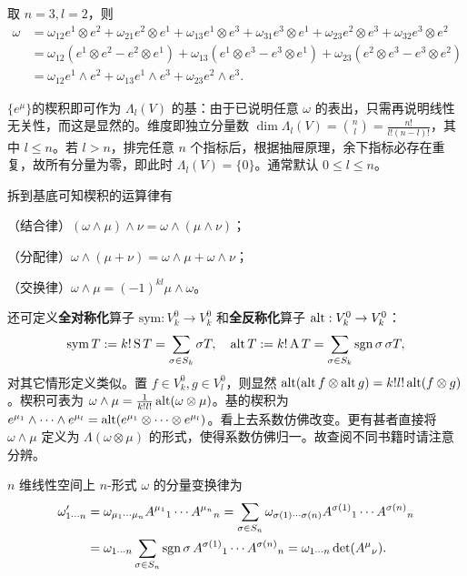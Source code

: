 \begin{example}
    取 $n=3,l=2$，则
\begin{align*}
    \omega&=\omega_{12}e^1\otimes e^2+\omega_{21}e^2\otimes e^1+\omega_{13}e^1\otimes e^3+\omega_{31}e^3\otimes e^1+\omega_{23}e^2\otimes e^3+\omega_{32}e^3\otimes e^2\\
    &=\omega_{12}(e^1\otimes e^2-e^2\otimes e^1)+\omega_{13}(e^1\otimes e^3-e^3\otimes e^1)+\omega_{23}(e^2\otimes e^3-e^3\otimes e^2)\\
    &=\omega_{12}e^1\wedge e^2+\omega_{13}e^1\wedge e^3+\omega_{23}e^2\wedge e^3.
\end{align*}
\end{example}

$\{e^\mu\}$的楔积即可作为 $\Lambda_l(V)$ 的基：由于已说明任意 $\omega$ 的表出，只需再说明线性无关性，而这是显然的。维度即独立分量数 $\dim\Lambda_l(V)=\binom{n}{l}=\frac{n!}{l!(n-l)!}$，其中 $l\leqslant n$。若 $l>n$，排完任意 $n$ 个指标后，根据抽屉原理，余下指标必存在重复，故所有分量为零，即此时 $\Lambda_l(V)=\{0\}$。通常默认 $0\leqslant l\leqslant n$。
\begin{theorem}拆到基底可知楔积的运算律有

    （结合律）$(\omega\wedge\mu)\wedge\nu=\omega\wedge(\mu\wedge\nu)$；

    （分配律）$\omega\wedge(\mu+\nu)=\omega\wedge\mu+\omega\wedge\nu$；

    （交换律）$\omega\wedge\mu=(-1)^{kl}\mu\wedge\omega$。
\end{theorem}

还可定义\textbf{全对称化}算子 $\mathrm{sym}:V^0_k\to V^0_k$ 和\textbf{全反称化}算子 $\operatorname{alt}:V^0_k\to V^0_k$：
\[\operatorname{sym} T:=k!\operatorname{S} T=\sum_{\sigma\in S_k} \sigma T,\quad \operatorname{alt} T:=k!\operatorname{A} T=\sum_{\sigma\in S_k} \operatorname{sgn}\sigma\,\sigma T,\]
对其它情形定义类似。置 $f\in V^0_k,g\in V^0_l$，则显然 $\operatorname{alt}(\operatorname{alt} f\otimes\operatorname{alt} g)=k!l!\operatorname{alt}(f\otimes g)$。楔积可表为 $\omega\wedge\mu=\frac{1}{k!l!}\operatorname{alt}(\omega\otimes\mu)$。基的楔积为 $e^{\mu_{1}}\wedge\cdots\wedge e^{\mu_{l}}=\operatorname{alt}( e^{\mu_{1}}\otimes\cdots\otimes e^{\mu_{l}})$。看上去系数仿佛改变。更有甚者直接将 $\omega\wedge\mu$ 定义为 $\Lambda(\omega\otimes\mu)$ 的形式，使得系数仿佛归一。故查阅不同书籍时请注意分辨。

\begin{theorem}
    $n$ 维线性空间上 $n$-形式 $\omega$ 的分量变换律为
    \begin{align}
        \omega'_{1\cdots n}&=\omega_{\mu_1\cdots\mu_n} A^{\mu_1}{}_{1} \cdots A^{\mu_n}{}_{n}=\sum_{\sigma\in S_n}\omega_{\sigma(1)\cdots\sigma(n)} A^{\sigma(1)}{}_{1} \cdots A^{\sigma(n)}{}_{n}\nonumber\\&=\omega_{1\cdots n}\sum_{\sigma\in S_n}\operatorname{sgn}\sigma\, A^{\sigma(1)}{}_{1} \cdots A^{\sigma(n)}{}_{n}=\omega_{1\cdots n} \det(A^{\mu}{}_{\nu}).
    \end{align}
\end{theorem}

